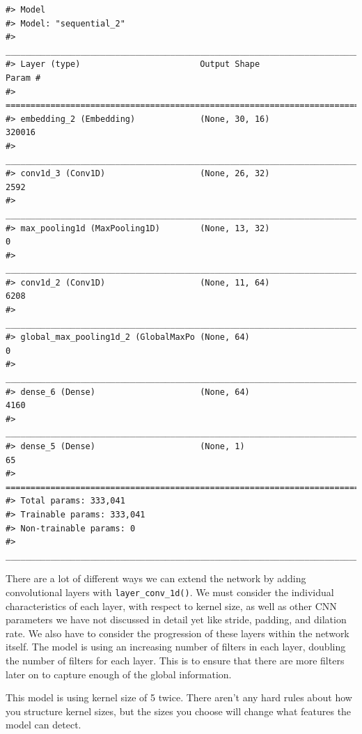 \documentclass[
]{krantz}
\begin{document}
\begin{verbatim}
#> Model
#> Model: "sequential_2"
#> ________________________________________________________________________________
#> Layer (type)                        Output Shape                    Param #     
#> ================================================================================
#> embedding_2 (Embedding)             (None, 30, 16)                  320016      
#> ________________________________________________________________________________
#> conv1d_3 (Conv1D)                   (None, 26, 32)                  2592        
#> ________________________________________________________________________________
#> max_pooling1d (MaxPooling1D)        (None, 13, 32)                  0           
#> ________________________________________________________________________________
#> conv1d_2 (Conv1D)                   (None, 11, 64)                  6208        
#> ________________________________________________________________________________
#> global_max_pooling1d_2 (GlobalMaxPo (None, 64)                      0           
#> ________________________________________________________________________________
#> dense_6 (Dense)                     (None, 64)                      4160        
#> ________________________________________________________________________________
#> dense_5 (Dense)                     (None, 1)                       65          
#> ================================================================================
#> Total params: 333,041
#> Trainable params: 333,041
#> Non-trainable params: 0
#> ________________________________________________________________________________
\end{verbatim}

There are a lot of different ways we can extend the network by adding convolutional layers with \texttt{layer\_conv\_1d()}. We must consider the individual characteristics of each layer, with respect to kernel size, as well as other CNN parameters we have not discussed in detail yet like stride, padding, and dilation rate. We also have to consider the progression of these layers within the network itself.
The model is using an increasing number of filters in each layer, doubling the number of filters for each layer. This is to ensure that there are more filters later on to capture enough of the global information.

This model is using kernel size of 5 twice. There aren't any hard rules about how you structure kernel sizes, but the sizes you choose will change what features the model can detect.
\end{document}

